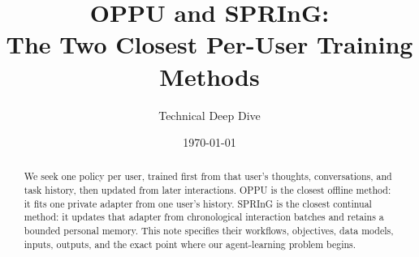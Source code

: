\documentclass[11pt]{article}
\title{\bfseries OPPU and SPRInG:\\
The Two Closest Per-User Training Methods}
\author{Technical Deep Dive}
\date{\today}
\begin{document}
\maketitle

\begin{abstract}
We seek one policy per user, trained first from that user's thoughts,
conversations, and task history, then updated from later interactions.  OPPU
is the closest offline method: it fits one private adapter from one user's
history.  SPRInG is the closest continual method: it updates that adapter from
chronological interaction batches and retains a bounded personal memory.  This
note specifies their workflows, objectives, data models, inputs, outputs, and
the exact point where our agent-learning problem begins.
\end{abstract}



\clearpage


\end{document}
